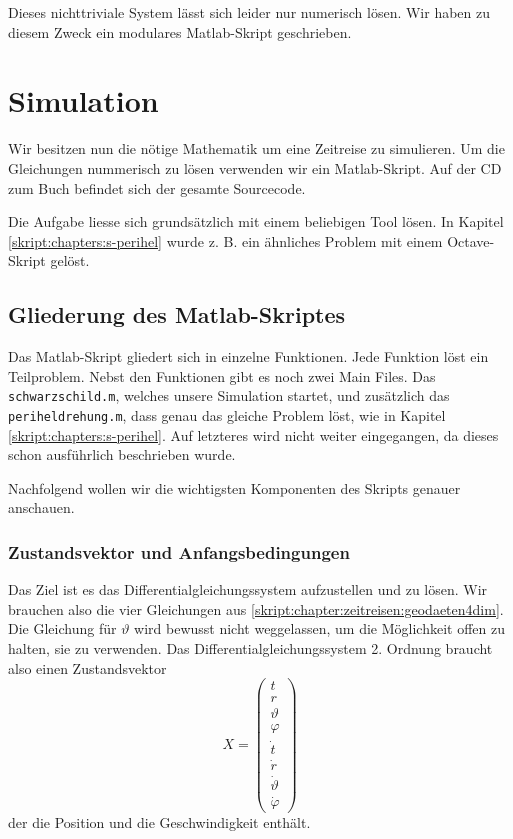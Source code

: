 \begin{refsection}
	Dieses nichttriviale System lässt sich leider nur numerisch lösen. Wir haben zu diesem Zweck ein modulares Matlab-Skript geschrieben. 
		
	\section{Simulation}
    
    Wir besitzen nun die nötige Mathematik um eine Zeitreise zu simulieren. Um die Gleichungen nummerisch zu lösen verwenden wir ein Matlab-Skript. Auf der CD zum Buch befindet sich der gesamte Sourcecode. 
    
    Die Aufgabe liesse sich grundsätzlich mit einem beliebigen Tool lösen. In Kapitel \ref{skript:chapters:s-perihel} wurde z. B. ein ähnliches Problem mit einem Octave-Skript gelöst. 

    \subsection{Gliederung des Matlab-Skriptes}
    Das Matlab-Skript gliedert sich in einzelne Funktionen. Jede Funktion löst ein Teilproblem. Nebst den Funktionen gibt es noch zwei Main Files. Das \texttt{schwarzschild.m}, welches unsere Simulation startet, und zusätzlich das \texttt{periheldrehung.m}, dass genau das gleiche Problem löst, wie in Kapitel \ref{skript:chapters:s-perihel}. Auf letzteres wird nicht weiter eingegangen, da dieses schon ausführlich beschrieben wurde.
    
    Nachfolgend wollen wir die wichtigsten Komponenten des Skripts genauer anschauen.

    \subsubsection{Zustandsvektor und Anfangsbedingungen}
    Das Ziel ist es das Differentialgleichungssystem aufzustellen und zu lösen. Wir brauchen also die vier Gleichungen aus \ref{skript:chapter:zeitreisen:geodaeten4dim}. Die Gleichung für $\vartheta$ wird bewusst nicht weggelassen, um die Möglichkeit offen zu halten, sie zu verwenden. 
    Das Differentialgleichungssystem 2. Ordnung braucht also einen Zustandsvektor
    \[
    X=\begin{pmatrix}
    t\\r\\\vartheta\\\varphi \\\dot t\\\dot r\\\dot \vartheta\\\dot\varphi
    \end{pmatrix}
    \]
    der die Position und die Geschwindigkeit enthält.
    

\end{refsection}
